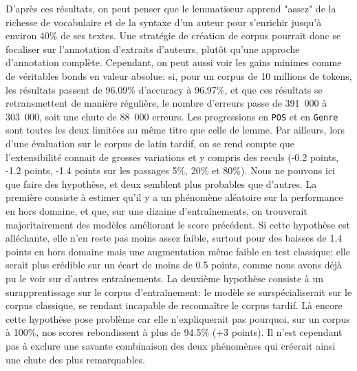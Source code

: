 D'après ces résultats, on peut penser que le lemmatiseur apprend "assez" de la richesse de vocabulaire et de la syntaxe d'un auteur pour s'enrichir jusqu'à environ 40\% de ses textes. Une stratégie de création de corpus pourrait donc se focaliser sur l'annotation d'extraits d'auteurs, plutôt qu'une approche d'annotation complète. Cependant, on peut aussi voir les gains minimes comme de véritables bonds en valeur absolue: si, pour un corpus de 10 millions de tokens, les résultats passent de 96.09\% d'accuracy à 96.97\%, et que ces résultats se retransmettent de manière régulière, le nombre d'erreurs passe de 391~000 à 303~000, soit une chute de 88~000 erreurs. Les progressions en \texttt{POS} et en \texttt{Genre} sont toutes les deux limitées au même titre que celle de lemme. Par ailleurs, lors d'une évaluation sur le corpus de latin tardif, on se rend compte que l'extensibilité connait de grosses variations et y compris des reculs (-0.2 points, -1.2 points, -1.4 points sur les passages 5\%, 20\% et 80\%). Nous ne pouvons ici que faire des hypothèse, et deux semblent plus probables que d'autres. La première consiste à estimer qu'il y a un phénomène aléatoire sur la performance en hors domaine, et que, sur une dizaine d'entraînements, on trouverait majoritairement des modèles améliorant le score précédent. Si cette hypothèse est alléchante, elle n'en reste pas moins assez faible, surtout pour des baisses de 1.4 points en hors domaine mais une augmentation même faible en test classique: elle serait plus crédible sur un écart de moins de 0.5 points, comme nous avons déjà pu le voir sur d'autres entraînements. La deuxième hypothèse consiste à un surapprentissage sur le corpus d'entraînement: le modèle se surspécialiserait sur le corpus classique, se rendant incapable de reconnaître le corpus tardif. Là encore cette hypothèse pose problème car elle n'expliquerait pas pourquoi, sur un corpus à 100\%, nos scores rebondissent à plus de 94.5\% (+3 points). Il n'est cependant pas à exclure une savante combinaison des deux phénomènes qui créerait ainsi une chute des plus remarquables.



